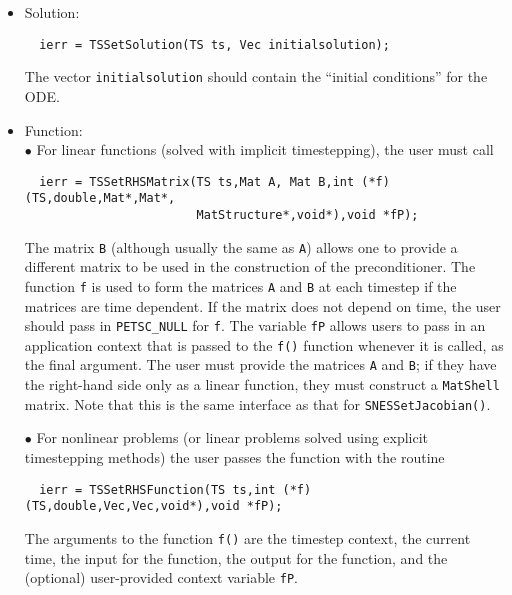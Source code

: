{\begin{itemize}
\item Solution:\\
\begin{verbatim}
  ierr = TSSetSolution(TS ts, Vec initialsolution);
\end{verbatim}
The vector {\tt initialsolution} should contain the ``initial conditions''
for the ODE. 

\item Function: \\
\subitem $ \bullet $ For linear functions (solved with implicit timestepping),
 the user must call 
\begin{verbatim}
  ierr = TSSetRHSMatrix(TS ts,Mat A, Mat B,int (*f)(TS,double,Mat*,Mat*,
                        MatStructure*,void*),void *fP);
\end{verbatim}
The matrix {\tt B} (although usually the same as {\tt A}) allows one to 
provide 
a different matrix to be used in the construction of the preconditioner.
The function {\tt f} is used to form the matrices {\tt A} and {\tt B} 
at each timestep if the matrices are time dependent.
If the matrix does not depend on time, the user should 
pass in {\tt PETSC\_NULL} for {\tt f}.  The variable {\tt fP} allows 
users to pass in an application context that is passed to the {\tt f()} function 
whenever it is called, as the final argument. The user must provide the matrices
{\tt A} and {\tt B}; if they have the right-hand side only as a linear
function, they must construct a {\tt MatShell} matrix. Note that this is 
the same interface as that for {\tt SNESSetJacobian()}. 

\subitem $ \bullet $  For nonlinear problems (or linear problems solved using
explicit timestepping methods) the user  passes the function with 
the routine

\begin{verbatim}
  ierr = TSSetRHSFunction(TS ts,int (*f)(TS,double,Vec,Vec,void*),void *fP);
\end{verbatim}
The  arguments to the function {\tt f()} are
the timestep context, the current time, the input for the function,
the output for the function, and the (optional) user-provided context
variable {\tt fP}.


\end{itemize}}
